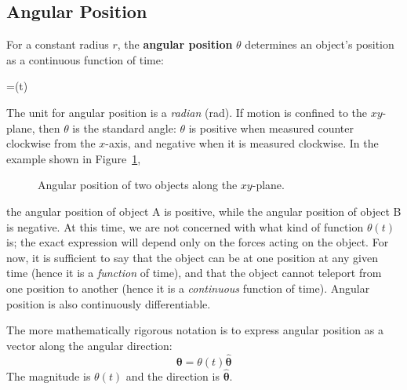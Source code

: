 \subsection{Angular Position}
For a constant radius $r$, the \textbf{angular position} $\theta$ determines an
object's position as a continuous function of
time:
\begin{important-equation}
  \theta=\theta(t)
\end{important-equation}
The unit for angular position is a \emph{radian} (rad). If motion is confined
to the $xy$-plane, then $\theta$ is the standard angle: $\theta$ is positive
when measured counter clockwise from the $x$-axis, and negative when it is
measured clockwise. In the example shown in Figure~\ref{fig:angular-position},
\begin{figure}[ht]
  \centering
  \caption{Angular position of two objects along the $xy$-plane.}
  \label{fig:angular-position}
\end{figure}
the angular position of object A is positive, while the angular position of
object B is negative. At this time, we are not concerned with what kind of
function $\theta(t)$ is; the exact expression will depend only on the forces
acting
on the object. For now, it is sufficient to say that the object can be at one
position at any given time (hence it is a \emph{function} of time), and that
the object cannot teleport from one position to another (hence it is a
\emph{continuous} function of time). Angular position is also continuously
differentiable.
\begin{remark}
  The more mathematically rigorous notation is to express angular position
  as a vector along the angular direction:
  \begin{displaymath}
    \bm\theta=\theta(t)\hat{\bm\theta}
  \end{displaymath}
  The magnitude is $\theta(t)$ and the direction is $\hat{\bm\theta}$.
\end{remark}

